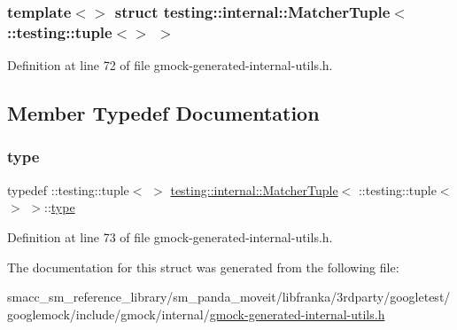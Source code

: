 \subsubsection*{template$<$$>$\newline
struct testing\+::internal\+::\+Matcher\+Tuple$<$ \+::testing\+::tuple$<$$>$ $>$}



Definition at line 72 of file gmock-\/generated-\/internal-\/utils.\+h.



\subsection{Member Typedef Documentation}
\mbox{\label{structtesting_1_1internal_1_1MatcherTuple_3_01_1_1testing_1_1tuple_3_4_01_4_a8d4493b2b299322e6c885dee5473ebd7}} 
\subsubsection{\texorpdfstring{type}{type}}
{\footnotesize\ttfamily typedef \+::testing\+::tuple$<$ $>$ \hyperlink{structtesting_1_1internal_1_1MatcherTuple}{testing\+::internal\+::\+Matcher\+Tuple}$<$ \+::testing\+::tuple$<$$>$ $>$\+::\hyperlink{structtesting_1_1internal_1_1MatcherTuple_3_01_1_1testing_1_1tuple_3_4_01_4_a8d4493b2b299322e6c885dee5473ebd7}{type}}



Definition at line 73 of file gmock-\/generated-\/internal-\/utils.\+h.



The documentation for this struct was generated from the following file\+:\begin{DoxyCompactItemize}
\item 
smacc\+\_\+sm\+\_\+reference\+\_\+library/sm\+\_\+panda\+\_\+moveit/libfranka/3rdparty/googletest/googlemock/include/gmock/internal/\hyperlink{gmock-generated-internal-utils_8h}{gmock-\/generated-\/internal-\/utils.\+h}\end{DoxyCompactItemize}
